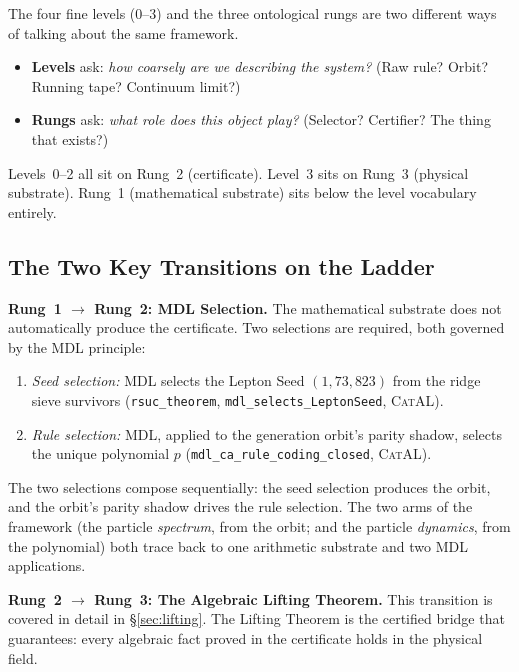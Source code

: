 \documentclass[11pt,a4paper]{article}
\newcommand{\lean}[1]{\texttt{#1}}
\newcommand{\poly}{p}
\newcommand{\CatAL}{\textsc{CatAL}}
\begin{document}
\begin{tcolorbox}[colback=boxblue,colframe=blue!40!black,
  title=The ladder is orthogonal to the level vocabulary]
The four fine levels (0--3) and the three ontological rungs are two
different ways of talking about the same framework.

\begin{itemize}[itemsep=4pt]
  \item \textbf{Levels} ask: \emph{how coarsely are we describing the system?}
    (Raw rule? Orbit? Running tape? Continuum limit?)
  \item \textbf{Rungs} ask: \emph{what role does this object play?}
    (Selector? Certifier? The thing that exists?)
\end{itemize}

Levels~0--2 all sit on Rung~2 (certificate).
Level~3 sits on Rung~3 (physical substrate).
Rung~1 (mathematical substrate) sits below the level vocabulary entirely.
\end{tcolorbox}

\subsection{The Two Key Transitions on the Ladder}

\medskip
\noindent\textbf{Rung~1 $\to$ Rung~2: MDL Selection.}
The mathematical substrate does not automatically produce the certificate.
Two selections are required, both governed by the MDL principle:
\begin{enumerate}[itemsep=3pt]
  \item \emph{Seed selection:} MDL selects the Lepton Seed $(1, 73, 823)$
    from the ridge sieve survivors
    (\lean{rsuc\_theorem}, \lean{mdl\_selects\_LeptonSeed}, \CatAL).
  \item \emph{Rule selection:} MDL, applied to the generation orbit's
    parity shadow, selects the unique polynomial $\poly$
    (\lean{mdl\_ca\_rule\_coding\_closed}, \CatAL).
\end{enumerate}

The two selections compose sequentially: the seed selection produces the
orbit, and the orbit's parity shadow drives the rule selection.
The two arms of the framework (the particle \emph{spectrum}, from the orbit;
and the particle \emph{dynamics}, from the polynomial) both trace back to
one arithmetic substrate and two MDL applications.

\medskip\noindent
\textbf{Rung~2 $\to$ Rung~3: The Algebraic Lifting Theorem.}
This transition is covered in detail in \S\ref{sec:lifting}.
The Lifting Theorem is the certified bridge that guarantees: every algebraic
fact proved in the certificate holds in the physical field.
\end{document}
